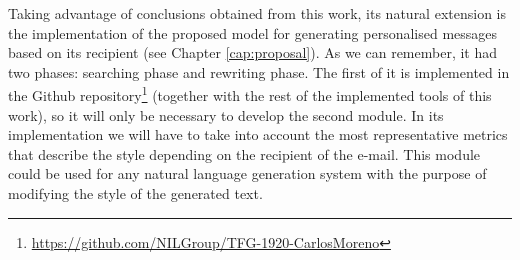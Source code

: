Taking advantage of conclusions obtained from this work, its natural extension is the implementation of the proposed model for generating personalised messages based on its recipient (see Chapter \ref{cap:proposal}). As we can remember, it had two phases: searching phase and rewriting phase. The first of it is implemented in the Github repository\footnote{\url{https://github.com/NILGroup/TFG-1920-CarlosMoreno}} (together with the rest of the implemented tools of this work), so it will only be necessary to develop the second module. In its implementation we will have to take into account the most representative metrics that describe the style depending on the recipient of the e-mail. This module could be used for any natural language generation system with the purpose of modifying the style of the generated text.